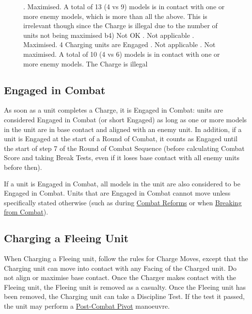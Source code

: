 \begin{figure}[!htbp]
\begin{minipage}{0.47\textwidth}
{	. Maximised. A total of 13 (4 vs 9) models is in contact with one or more enemy models, which is more than all the above. This is irrelevant though since the Charge is illegal due to the number of units not being maximised
	\captionpar
	b4) Not OK\captionlist
	. Not applicable\newline
	. Maximised. 4 Charging units are Engaged\newline
	. Not applicable\newline
	. Not maximised. A total of 10 (4 vs 6) models is in contact with one or more enemy models. The Charge is illegal
}
	\label{figure/combined_charges}
	\end{minipage}
\end{figure}

\subsection{Engaged in Combat}
\label{engaged_in_combat}

As soon as a unit completes a Charge, it is Engaged in Combat: units are considered Engaged in Combat (or short Engaged) as long as one or more models in the unit are in base contact and aligned with an enemy unit. In addition, if a unit is Engaged at the start of a Round of Combat, it counts as Engaged until the start of step 7 of the Round of Combat Sequence (before calculating Combat Score and taking Break Tests, even if it loses base contact with all enemy units before then).

If a unit is Engaged in Combat, all models in the unit are also considered to be Engaged in Combat. Units that are Engaged in Combat cannot move unless specifically stated otherwise (such as during \hyperref[combat_reform]{Combat Reforms} or when \hyperref[break_test]{Breaking from Combat}).

\subsection{Charging a Fleeing Unit}
\label{charging_a_fleeing_unit}

When Charging a Fleeing unit, follow the rules for Charge Moves, except that the Charging unit can move into contact with any Facing of the Charged unit. Do not align or maximise base contact. Once the Charger makes contact with the Fleeing unit, the Fleeing unit is removed as a casualty. Once the Fleeing unit has been removed, the Charging unit can take a Discipline Test. If the test it passed, the unit may perform a \hyperref[post_combat_pivot]{Post-Combat Pivot} manoeuvre.

